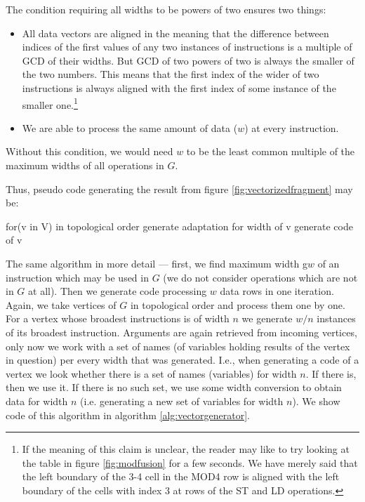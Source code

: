 \begin{rem}
  The condition requiring all widths to be powers of two ensures two things:
  \begin{itemize}
    \item All data vectors are aligned in the meaning that the difference between indices of the first values of any two instances of instructions is a multiple of GCD of their widths. But GCD of two powers of two is always the smaller of the two numbers. This means that the first index of the wider of two instructions is always aligned with the first index of some instance of the smaller one.\footnote{If the meaning of this claim is unclear, the reader may like to try looking at the table in figure \ref{fig:modfusion} for a few seconds. We have merely said that the left boundary of the 3-4 cell in the MOD4 row is aligned with the left boundary of the cells with index 3 at rows of the ST and LD operations.}
    \item We are able to process the same amount of data ($w$) at every instruction.
  \end{itemize}
  Without this condition, we would need $w$ to be the least common multiple of the maximum widths of all operations in $G$. 
\end{rem}

Thus, pseudo code generating the result from figure \ref{fig:vectorizedfragment} may be:

\begin{code}
for(v in V) in topological order
{
  generate adaptation for width of v
  generate code of v
}
\end{code}

The same algorithm in more detail --- first, we find maximum width g$w$ of an instruction which may be used in $G$ (we do not consider operations which are not in $G$ at all). Then we generate code processing $w$ data rows in one iteration. Again, we take vertices of $G$ in topological order and process them one by one. For a vertex whose broadest instructions is of width $n$ we generate $w/n$ instances of its broadest instruction. Arguments are again retrieved from incoming vertices, only now we work with a set of names (of variables holding  results of the vertex in question) per every width that was generated. I.e., when generating a code of a vertex we look whether there is a set of names (variables) for width $n$. If there is, then we use it. If there is no such set, we use some width conversion to obtain data for width $n$ (i.e. generating a new set of variables for width $n$). We show code of this algorithm in algorithm \ref{alg:vectorgenerator}.

